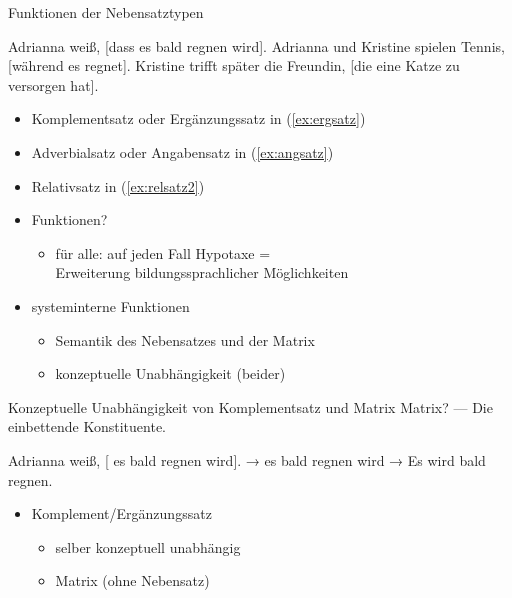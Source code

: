 \begin{frame}
  {Funktionen der Nebensatztypen}
  \pause
  \begin{exe}
    \ex Adrianna weiß, [\alert{dass es bald regnen wird}].\label{ex:ergsatz}
    \pause
    \ex Adrianna und Kristine spielen Tennis, [\alert{während es regnet}].\label{ex:angsatz}
    \pause
    \ex Kristine trifft später die Freundin, [\alert{die eine Katze zu versorgen hat}].\label{ex:relsatz2}
  \end{exe}
  \pause
  \Halbzeile
  \begin{itemize}[<+->]
    \item \alert{Komplementsatz} oder \alert{Ergänzungssatz} in (\ref{ex:ergsatz})
    \item \alert{Adverbialsatz} oder \alert{Angabensatz} in (\ref{ex:angsatz})
    \item \alert{Relativsatz} in (\ref{ex:relsatz2})
    \item Funktionen?
      \begin{itemize}[<+->]
        \item für alle: auf jeden Fall \alert{Hypotaxe =\\
          Erweiterung bildungssprachlicher Möglichkeiten}
      \end{itemize}
    \item systeminterne Funktionen
      \begin{itemize}[<+->]
        \item Semantik des Nebensatzes und der Matrix
        \item konzeptuelle Unabhängigkeit (beider)
      \end{itemize}
  \end{itemize}
\end{frame}

\begin{frame}
  {Konzeptuelle Unabhängigkeit von Komplementsatz und Matrix}
  \pause
  \alert{Matrix}? --- Die \alert{einbettende} Konstituente.\\
  \pause\Halbzeile
  \begin{exe}
    \ex
    \begin{xlist}
      \ex Adrianna weiß, [ \alert{es bald regnen wird}].
      \pause
      \ex → \alert{es bald regnen wird}
      \pause
      \ex → \alert{Es wird bald regnen.}
    \end{xlist}
    \pause
  \end{exe}
  \pause\Halbzeile
  \begin{itemize}[<+->]
    \item Komplement\slash Ergänzungssatz
      \begin{itemize}[<+->]
        \item selber \alert{konzeptuell unabhängig}
        \item Matrix  (ohne Nebensatz)
      \end{itemize}
  \end{itemize}
\end{frame}

